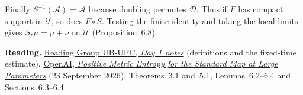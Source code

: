 \documentclass[11pt,a4paper]{article}
\newcommand{\D}{\mathcal{D}}
\newcommand{\A}{\mathcal{A}}
\newcommand{\U}{\mathcal{U}}
\newcommand{\seminarurl}{https://kaminoite.github.io/jordilluisfigueras/ReadingGroupUBUPCPositiveMetricEntropy}
\newcommand{\paperurl}{https://github.com/openai/math/blob/main/preprints/Positive-Metric-Entropy-for-the-Standard-Map-at-Large-Parameters-September-23-2026/paper.pdf}
\begin{document}
Finally $S^{-1}(\A)=\A$ because doubling permutes $\D$. Thus if $F$ has compact
support in $\U$, so does $F\circ S$. Testing the finite identity and taking
the local limits gives $S_*\mu=\mu+\nu$ on $\U$ (Proposition~6.8).

\medskip
\textbf{Reading.}
\href{\seminarurl/summaryPosMetStandardMap.pdf}{Reading Group UB-UPC,
\emph{Day 1 notes}} (definitions and the fixed-time estimate).
\href{\paperurl}{OpenAI, \emph{Positive Metric Entropy for the Standard Map at
Large Parameters}} (23 September 2026), Theorems~3.1 and~5.1, Lemmas~6.2--6.4
and Sections~6.3--6.4.
\end{document}
